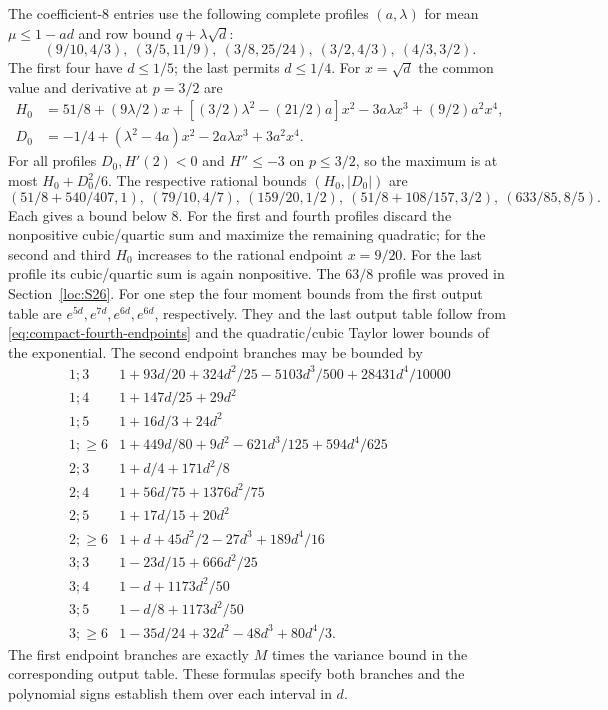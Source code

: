 The coefficient-$8$ entries use the following complete profiles
$(a,\lambda)$ for mean $\mu\le1-ad$ and row bound $q+\lambda\sqrt d$:
\[
 (9/10,4/3),\ (3/5,11/9),\ (3/8,25/24),\ (3/2,4/3),\ (4/3,3/2).
\]
The first four have $d\le1/5$; the last permits $d\le1/4$.
For $x=\sqrt d$ the common value and derivative at $p=3/2$ are
\begin{align*}
 H_0&=51/8+(9\lambda/2)x+[(3/2)\lambda^2-(21/2)a]x^2
                              -3a\lambda x^3+(9/2)a^2x^4,\\
 D_0&=-1/4+(\lambda^2-4a)x^2-2a\lambda x^3+3a^2x^4.
\end{align*}
For all profiles $D_0,H'(2)<0$ and $H''\le-3$ on $p\le3/2$,
so the maximum is at most $H_0+D_0^2/6$.
The respective rational bounds $(H_0,|D_0|)$ are
\[
 (51/8+540/407,1),\ (79/10,4/7),\ (159/20,1/2),\
 (51/8+108/157,3/2),\ (633/85,8/5).
\]
Each gives a bound below $8$.
For the first and fourth profiles discard the nonpositive cubic/quartic
sum and maximize the remaining quadratic; for the second and third
$H_0$ increases to the rational endpoint $x=9/20$.
For the last profile its cubic/quartic sum is again nonpositive.
The $63/8$ profile was proved in Section~\ref{loc:S26}.
For one step the four moment bounds from the first output table are
$e^{5d},e^{7d},e^{6d},e^{6d}$, respectively.
They and the last output table follow from
\eqref{eq:compact-fourth-endpoints} and the quadratic/cubic Taylor lower
bounds of the exponential. The second endpoint branches may be bounded by
\[
 \begin{array}{c|l}
 1;3&1+93d/20+324d^2/25-5103d^3/500+28431d^4/10000\\
 1;4&1+147d/25+29d^2\\
 1;5&1+16d/3+24d^2\\
 1;\ge6&1+449d/80+9d^2-621d^3/125+594d^4/625\\
 2;3&1+d/4+171d^2/8\\
 2;4&1+56d/75+1376d^2/75\\
 2;5&1+17d/15+20d^2\\
 2;\ge6&1+d+45d^2/2-27d^3+189d^4/16\\
 3;3&1-23d/15+666d^2/25\\
 3;4&1-d+1173d^2/50\\
 3;5&1-d/8+1173d^2/50\\
 3;\ge6&1-35d/24+32d^2-48d^3+80d^4/3.
 \end{array}
\]
The first endpoint branches are exactly $M$ times the variance bound in
the corresponding output table. These formulas specify both branches
and the polynomial signs establish them over each interval in $d$.

